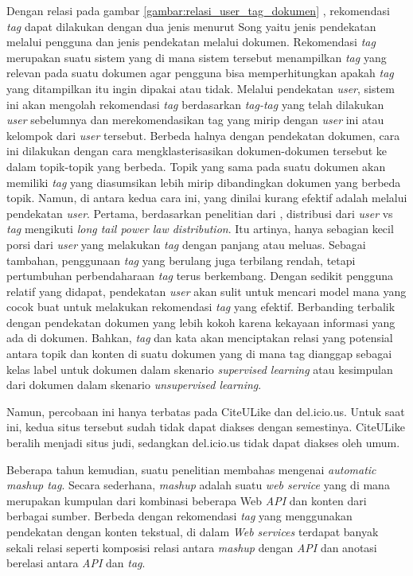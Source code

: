 Dengan relasi pada gambar \ref{gambar:relasi_user_tag_dokumen} , rekomendasi \textit{tag} dapat dilakukan dengan dua jenis menurut Song yaitu jenis pendekatan melalui pengguna dan jenis pendekatan melalui dokumen. Rekomendasi \textit{tag} merupakan suatu sistem yang di mana sistem tersebut menampilkan \textit{tag} yang relevan pada suatu dokumen agar pengguna bisa memperhitungkan apakah \textit{tag} yang ditampilkan itu ingin dipakai atau tidak. Melalui pendekatan \textit{user}, sistem ini akan mengolah rekomendasi \textit{tag} berdasarkan \textit{tag-tag} yang telah dilakukan \textit{user} sebelumnya dan merekomendasikan tag yang mirip dengan \textit{user} ini atau kelompok dari \textit{user} tersebut. Berbeda halnya dengan pendekatan dokumen, cara ini dilakukan dengan cara mengklasterisasikan dokumen-dokumen tersebut ke dalam topik-topik yang berbeda. Topik yang sama pada suatu dokumen akan memiliki \textit{tag} yang diasumsikan lebih mirip dibandingkan dokumen yang berbeda topik. Namun, di antara kedua cara ini, yang dinilai kurang efektif adalah melalui pendekatan \textit{user}. Pertama, berdasarkan penelitian dari \cite{farooq_social_bookmarking}, distribusi dari \textit{user} vs \textit{tag} mengikuti \textit{long tail power law distribution}. Itu artinya, hanya sebagian kecil porsi dari \textit{user} yang melakukan \textit{tag} dengan panjang atau meluas. Sebagai tambahan, penggunaan \textit{tag} yang berulang juga terbilang rendah, tetapi pertumbuhan perbendaharaan \textit{tag} terus berkembang. Dengan sedikit pengguna relatif yang didapat, pendekatan \textit{user} akan sulit untuk mencari model mana yang cocok buat untuk melakukan rekomendasi \textit{tag} yang efektif. Berbanding terbalik dengan pendekatan dokumen yang lebih kokoh karena kekayaan informasi yang ada di dokumen. Bahkan, \textit{tag} dan kata akan menciptakan relasi yang potensial antara topik dan konten di suatu dokumen yang di mana tag dianggap sebagai kelas label untuk dokumen dalam skenario \textit{supervised learning} atau kesimpulan dari dokumen dalam skenario \textit{unsupervised learning}. \citep{song2011autotag}

Namun, percobaan ini hanya terbatas pada CiteULike dan del.icio.us. Untuk saat ini, kedua situs tersebut sudah tidak dapat diakses dengan semestinya. CiteULike beralih menjadi situs judi, sedangkan del.icio.us tidak dapat diakses oleh umum.
	
Beberapa tahun kemudian, suatu penelitian membahas mengenai \textit{automatic mashup tag}. Secara sederhana, \textit{mashup} adalah suatu \textit{web service} yang di mana merupakan kumpulan dari kombinasi beberapa Web \textit{API} dan konten dari berbagai sumber. Berbeda dengan rekomendasi \textit{tag} yang menggunakan pendekatan dengan konten tekstual, di dalam \textit{Web services} terdapat banyak sekali relasi seperti komposisi relasi antara \textit{mashup} dengan \textit{API} dan anotasi berelasi antara \textit{API} dan \textit{tag}. \citep{shi2016mashuptag}

